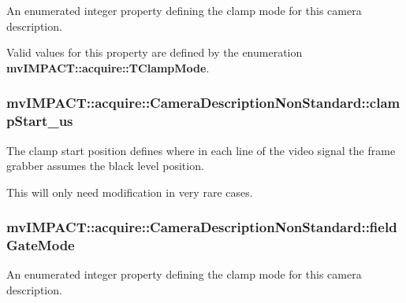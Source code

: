 An enumerated integer property defining the clamp mode for this camera description. 

Valid values for this property are defined by the enumeration {\bfseries mv\+I\+M\+P\+A\+C\+T\+::acquire\+::\+T\+Clamp\+Mode}. \hypertarget{classmv_i_m_p_a_c_t_1_1acquire_1_1_camera_description_non_standard_a6135afff218b13b8b1db5eb04729e5b9}{
\subsubsection[{clamp\+Start\+\_\+us}]{ mv\+I\+M\+P\+A\+C\+T\+::acquire\+::\+Camera\+Description\+Non\+Standard\+::clamp\+Start\+\_\+us}}\label{classmv_i_m_p_a_c_t_1_1acquire_1_1_camera_description_non_standard_a6135afff218b13b8b1db5eb04729e5b9}


The clamp start position defines where in each line of the video signal the frame grabber assumes the black level position. 

This will only need modification in very rare cases. \hypertarget{classmv_i_m_p_a_c_t_1_1acquire_1_1_camera_description_non_standard_a741b45e81e1aad1caa43cb60068a86c0}{
\subsubsection[{field\+Gate\+Mode}]{ mv\+I\+M\+P\+A\+C\+T\+::acquire\+::\+Camera\+Description\+Non\+Standard\+::field\+Gate\+Mode}}\label{classmv_i_m_p_a_c_t_1_1acquire_1_1_camera_description_non_standard_a741b45e81e1aad1caa43cb60068a86c0}


An enumerated integer property defining the clamp mode for this camera description. 

